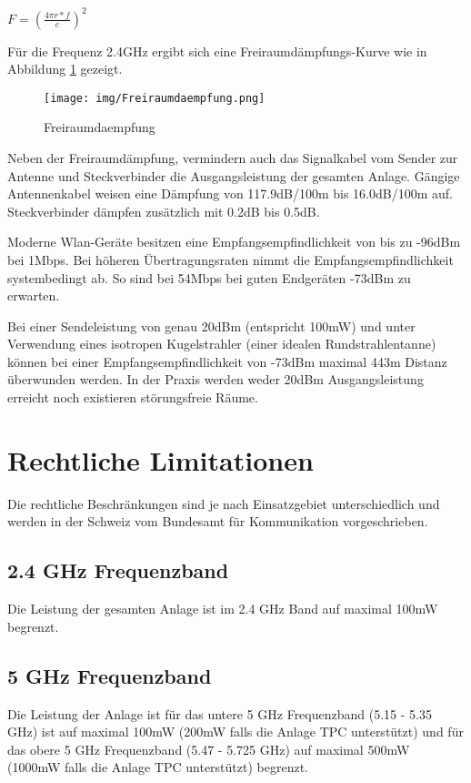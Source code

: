 \documentclass[oneside,11pt,parskip=half,ngerman]{scrreprt}
\makeatletter
\def\maxwidth{\ifdim\Gin@nat@width>\linewidth\linewidth
\else\Gin@nat@width\fi}
\let\Oldincludegraphics\includegraphics
\renewcommand{\includegraphics}[1]{\Oldincludegraphics[width=\maxwidth,height=20em,keepaspectratio]{#1}}
\makeatother
\begin{document}
\(F = (\frac{4\pi r * f }{c})^2\)

Für die Frequenz 2.4GHz ergibt sich eine Freiraumdämpfungs-Kurve wie in
Abbildung \ref{fig:fa} gezeigt.

\begin{figure}[htbp]
\centering
\texttt{[image: img/Freiraumdaempfung.png]}
\caption{Freiraumdaempfung\label{fig:fa}}
\end{figure}

Neben der Freiraumdämpfung, vermindern auch das Signalkabel vom Sender
zur Antenne und Steckverbinder die Ausgangsleistung der gesamten Anlage.
Gängige Antennenkabel weisen eine Dämpfung von 117.9dB/100m bis
16.0dB/100m auf. Steckverbinder dämpfen zusätzlich mit 0.2dB bis 0.5dB.

Moderne Wlan-Geräte besitzen eine Empfangsempfindlichkeit von bis zu
-96dBm bei 1Mbps. Bei höheren Übertragungsraten nimmt die
Empfangsempfindlichkeit systembedingt ab. So sind bei 54Mbps bei guten
Endgeräten -73dBm zu erwarten.

Bei einer Sendeleistung von genau 20dBm (entspricht 100mW) und unter
Verwendung eines isotropen Kugelstrahler (einer idealen
Rundstrahlentanne) können bei einer Empfangsempfindlichkeit von -73dBm
maximal 443m Distanz überwunden werden. In der Praxis werden weder 20dBm
Ausgangsleistung erreicht noch existieren störungsfreie Räume.

\section{Rechtliche Limitationen}\label{rechtliche-limitationen}

Die rechtliche Beschränkungen sind je nach Einsatzgebiet unterschiedlich
und werden in der Schweiz vom Bundesamt für Kommunikation
vorgeschrieben.

\subsection{2.4 GHz Frequenzband}\label{ghz-frequenzband}

Die Leistung der gesamten Anlage ist im 2.4 GHz Band auf maximal 100mW
begrenzt. \autocite{bakomwlan}

\subsection{5 GHz Frequenzband}\label{ghz-frequenzband-1}

Die Leistung der Anlage ist für das untere 5 GHz Frequenzband (5.15 -
5.35 GHz) ist auf maximal 100mW (200mW falls die Anlage TPC unterstützt)
und für das obere 5 GHz Frequenzband (5.47 - 5.725 GHz) auf maximal
500mW (1000mW falls die Anlage TPC unterstützt) begrenzt.
\autocite{bakomwlan}
\end{document}
